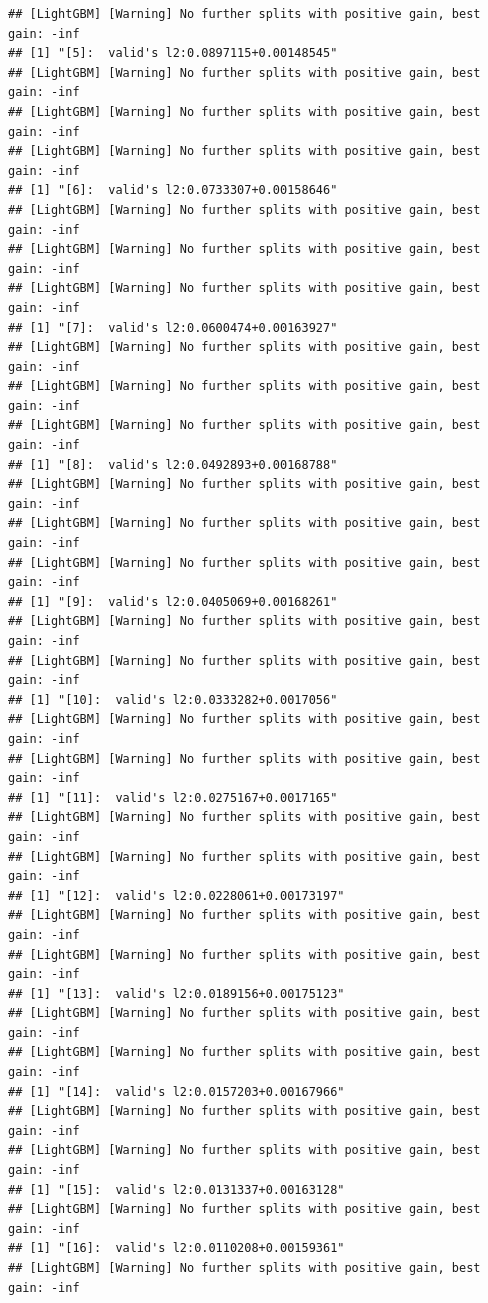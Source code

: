 \documentclass[
]{book}
\begin{document}
\begin{verbatim}
## [LightGBM] [Warning] No further splits with positive gain, best gain: -inf
## [1] "[5]:  valid's l2:0.0897115+0.00148545"
## [LightGBM] [Warning] No further splits with positive gain, best gain: -inf
## [LightGBM] [Warning] No further splits with positive gain, best gain: -inf
## [LightGBM] [Warning] No further splits with positive gain, best gain: -inf
## [1] "[6]:  valid's l2:0.0733307+0.00158646"
## [LightGBM] [Warning] No further splits with positive gain, best gain: -inf
## [LightGBM] [Warning] No further splits with positive gain, best gain: -inf
## [LightGBM] [Warning] No further splits with positive gain, best gain: -inf
## [1] "[7]:  valid's l2:0.0600474+0.00163927"
## [LightGBM] [Warning] No further splits with positive gain, best gain: -inf
## [LightGBM] [Warning] No further splits with positive gain, best gain: -inf
## [LightGBM] [Warning] No further splits with positive gain, best gain: -inf
## [1] "[8]:  valid's l2:0.0492893+0.00168788"
## [LightGBM] [Warning] No further splits with positive gain, best gain: -inf
## [LightGBM] [Warning] No further splits with positive gain, best gain: -inf
## [LightGBM] [Warning] No further splits with positive gain, best gain: -inf
## [1] "[9]:  valid's l2:0.0405069+0.00168261"
## [LightGBM] [Warning] No further splits with positive gain, best gain: -inf
## [LightGBM] [Warning] No further splits with positive gain, best gain: -inf
## [1] "[10]:  valid's l2:0.0333282+0.0017056"
## [LightGBM] [Warning] No further splits with positive gain, best gain: -inf
## [LightGBM] [Warning] No further splits with positive gain, best gain: -inf
## [1] "[11]:  valid's l2:0.0275167+0.0017165"
## [LightGBM] [Warning] No further splits with positive gain, best gain: -inf
## [LightGBM] [Warning] No further splits with positive gain, best gain: -inf
## [1] "[12]:  valid's l2:0.0228061+0.00173197"
## [LightGBM] [Warning] No further splits with positive gain, best gain: -inf
## [LightGBM] [Warning] No further splits with positive gain, best gain: -inf
## [1] "[13]:  valid's l2:0.0189156+0.00175123"
## [LightGBM] [Warning] No further splits with positive gain, best gain: -inf
## [LightGBM] [Warning] No further splits with positive gain, best gain: -inf
## [1] "[14]:  valid's l2:0.0157203+0.00167966"
## [LightGBM] [Warning] No further splits with positive gain, best gain: -inf
## [LightGBM] [Warning] No further splits with positive gain, best gain: -inf
## [1] "[15]:  valid's l2:0.0131337+0.00163128"
## [LightGBM] [Warning] No further splits with positive gain, best gain: -inf
## [1] "[16]:  valid's l2:0.0110208+0.00159361"
## [LightGBM] [Warning] No further splits with positive gain, best gain: -inf

\end{verbatim}
\end{document}
